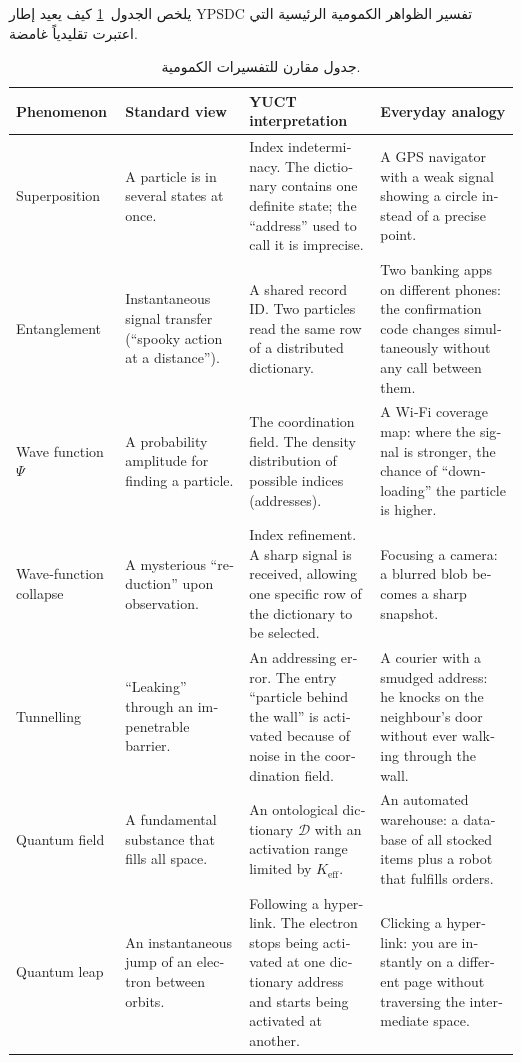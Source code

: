 \documentclass[12pt,a4paper]{article}
\theoremstyle{remark}
\begin{document}
	يلخص الجدول~\ref{tab:quantum-interpretations} كيف يعيد إطار YPSDC تفسير الظواهر الكمومية الرئيسية التي اعتبرت تقليدياً غامضة.
	
	\begin{otherlanguage}{english}
		\begin{table}[H]
			\centering
			\caption{جدول مقارن للتفسيرات الكمومية.}
			\label{tab:quantum-interpretations}
			\small
			\begin{tabularx}{\textwidth}{p{2.5cm} p{2.8cm} p{4.2cm} p{4.5cm}}
				\toprule
				\textbf{Phenomenon} & \textbf{Standard view} & \textbf{YUCT interpretation} & \textbf{Everyday analogy} \\
				\midrule
				Superposition &
				A particle is in several states at once. &
				Index indeterminacy. The dictionary contains one definite state; the ``address'' used to call it is imprecise. &
				A GPS navigator with a weak signal showing a circle instead of a precise point. \\
				\addlinespace
				Entanglement &
				Instantaneous signal transfer (``spooky action at a distance''). &
				A shared record ID. Two particles read the same row of a distributed dictionary. &
				Two banking apps on different phones: the confirmation code changes simultaneously without any call between them. \\
				\addlinespace
				Wave function \( \Psi \) &
				A probability amplitude for finding a particle. &
				The coordination field. The density distribution of possible indices (addresses). &
				A Wi‑Fi coverage map: where the signal is stronger, the chance of ``downloading'' the particle is higher. \\
				\addlinespace
				Wave‑function collapse &
				A mysterious ``reduction'' upon observation. &
				Index refinement. A sharp signal is received, allowing one specific row of the dictionary to be selected. &
				Focusing a camera: a blurred blob becomes a sharp snapshot. \\
				\addlinespace
				Tunnelling &
				``Leaking'' through an impenetrable barrier. &
				An addressing error. The entry ``particle behind the wall'' is activated because of noise in the coordination field. &
				A courier with a smudged address: he knocks on the neighbour's door without ever walking through the wall. \\
				\addlinespace
				Quantum field &
				A fundamental substance that fills all space. &
				An ontological dictionary \( \mathcal{D} \) with an activation range limited by \( K_{\mathrm{eff}} \). &
				An automated warehouse: a database of all stocked items plus a robot that fulfills orders. \\
				\addlinespace
				Quantum leap &
				An instantaneous jump of an electron between orbits. &
				Following a hyperlink. The electron stops being activated at one dictionary address and starts being activated at another. &
				Clicking a hyperlink: you are instantly on a different page without traversing the intermediate space. \\
				\bottomrule
			\end{tabularx}
		\end{table}
	\end{otherlanguage}
	
\end{document}
